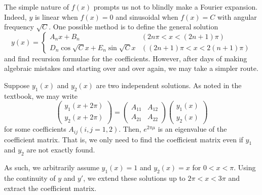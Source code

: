 \item

The simple nature of $f(x)$ prompts us not to blindly make a Fourier expansion.
Indeed, $y$ is linear when $f(x) = 0$ and sinusoidal when $f(x) = C$
with angular frequency $\sqrt{C}$.
One possible method is to define the general solution
\[
    y(x) = \begin{cases}
        A_n x + B_n & (2n\pi < x < (2n + 1) \pi) \\
        D_n \cos \sqrt{C}x + E_n \sin \sqrt{C}x & ((2n + 1) \pi < x < 2(n + 1)\pi)
    \end{cases}
\]
and find recursion formulae for the coefficients.
However, after days of making algebraic mistakes and starting over and over again,
we may take a simpler route.

Suppose $y_1(x)$ and $y_2(x)$ are two independent solutions.
As noted in the textbook, we may write
\[
    \begin{pmatrix}
        y_1(x + 2\pi) \\ y_2(x + 2\pi)
    \end{pmatrix}
    = \begin{pmatrix}
        A_{11} & A_{12} \\
        A_{21} & A_{22}
    \end{pmatrix} \begin{pmatrix}
        y_1(x) \\ y_2(x)
    \end{pmatrix}
\]
for some coefficients $A_{ij} (i, j = 1, 2)$.
Then, $e^{2\pi\mu}$ is an eigenvalue of the coefficient matrix.
That is, we only need to find the coefficient matrix
even if $y_1$ and $y_2$ are not exactly found.

As such, we arbitrarily assume $y_1(x) = 1$ and $y_2(x) = x$ for $0 < x < \pi$.
Using the continuity of $y$ and $y'$, we extend these solutions up to $2\pi < x < 3\pi$
and extract the coefficient matrix.

